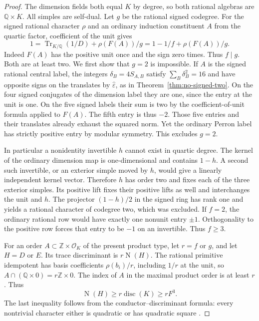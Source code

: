 \documentclass[11pt,a4paper]{article}
\numberwithin{equation}{section}
\begin{document}
\begin{proof}
The dimension fields both equal $K$ by degree, so both rational algebras
are $\mathbb Q\times K$. All simples are self-dual. Let $g$ be the
rational signed codegree. For the signed rational character $\rho$ and an
ordinary induction constituent $A$ from the quartic factor, coefficient
of the unit gives
\[
 1=\operatorname{Tr}_{K/\mathbb Q}(1/D)+\rho(F(A))/g
   =1-1/f+\rho(F(A))/g .
\]
Indeed $F(A)$ has the positive unit once and the sign zero times. Thus
$f\mid g$. Both are at least two. We first show that $g=2$ is impossible. If $A$ is the signed rational central label, the integers $\delta_B=4S_{A,B}$ satisfy $\sum_B\delta_B^2=16$ and have opposite signs on the translates by $\widehat\varepsilon$, as in Theorem~\ref{thm:no-signed-two}. On the four signed conjugates of the dimension label they are one, since the entry at the unit is one. On the five signed labels their sum is two by the coefficient-of-unit formula applied to $F(A)$. The fifth entry is thus $-2$. Those five entries and their translates already exhaust the squared norm. Yet the ordinary Perron label has strictly positive entry by modular symmetry. This excludes $g=2$.

In particular a nonidentity invertible $h$ cannot exist in quartic degree. The kernel of the ordinary dimension map is one-dimensional and contains $1-h$. A second such invertible, or an exterior simple moved by $h$, would give a linearly independent kernel vector. Therefore $h$ has order two and fixes each of the three exterior simples. Its positive lift fixes their positive lifts as well and interchanges the unit and $h$. The projector $(1-h)/2$ in the signed ring has rank one and yields a rational character of codegree two, which was excluded. If $f=2$, the ordinary rational row would have exactly one nonunit entry $\pm1$. Orthogonality to the positive row forces that entry to be $-1$ on an invertible. Thus $f\ge3$.

For an order $A\subset\mathbb Z\times\mathcal O_K$ of the present
product type, let $r=f$ or $g$, and let $H=D$ or $E$. Its trace
discriminant is $r\operatorname{N}(H)$. The rational primitive
idempotent has basis coefficients $\rho(b_i)/r$, including $1/r$ at the
unit, so $A\cap(\mathbb Q\times0)=r\mathbb Z\times0$. The index of
$A$ in the maximal product order is at least $r$. Thus
\[
 \operatorname{N}(H)\ge r\operatorname{disc}(K)\ge rF^3 .
\]
The last inequality follows from the conductor--discriminant formula:
every nontrivial character either is quadratic or has quadratic square
\cite{Was}.


\end{proof}
\end{document}
